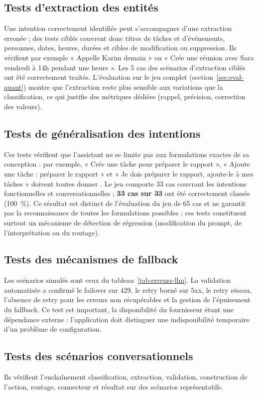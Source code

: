\documentclass[11pt,a4paper,openany,oneside]{report}
\newcommand{\intent}[1]{\texttt{\detokenize{#1}}}
\begin{document}
\subsection{Tests d'extraction des entités}
Une intention correctement identifiée peut s'accompagner d'une extraction erronée ; des tests ciblés couvrent donc titres de tâches et d'événements, personnes, dates, heures, durées et cibles de modification ou suppression. Ils vérifient par exemple « Appelle Karim demain » ou « Crée une réunion avec Sara vendredi à 14h pendant une heure ». Les 5 cas des scénarios d'extraction ciblés ont été correctement traités. L'évaluation sur le jeu complet (section~\ref{sec:eval-quant}) montre que l'extraction reste plus sensible aux variations que la classification, ce qui justifie des métriques dédiées (rappel, précision, correction des valeurs).

\subsection{Tests de généralisation des intentions}\label{sec:tests-generalisation}
Ces tests vérifient que l'assistant ne se limite pas aux formulations exactes de sa conception : par exemple, « Crée une tâche pour préparer le rapport », « Ajoute une tâche : préparer le rapport » et « Je dois préparer le rapport, ajoute-le à mes tâches » doivent toutes donner \intent{create_task}. Le jeu comporte 33 cas couvrant les intentions fonctionnelles et conversationnelles ; \textbf{33 cas sur 33} ont été correctement classés (100~\%). Ce résultat est distinct de l'évaluation du jeu de 65 cas et ne garantit pas la reconnaissance de toutes les formulations possibles ; ces tests constituent surtout un mécanisme de détection de régression (modification du prompt, de l'interprétation ou du routage).

\subsection{Tests des mécanismes de fallback}
Les scénarios simulés sont ceux du tableau~\ref{tab:erreurs-llm}. La validation automatisée a confirmé le failover sur 429, le retry borné sur 5xx, le retry réseau, l'absence de retry pour les erreurs non récupérables et la gestion de l'épuisement du fallback. Ce test est important, la disponibilité du fournisseur étant une dépendance externe : l'application doit distinguer une indisponibilité temporaire d'un problème de configuration.

\subsection{Tests des scénarios conversationnels}
Ils vérifient l'enchaînement classification, extraction, validation, construction de l'action, routage, connecteur et résultat sur des scénarios représentatifs.
\end{document}
